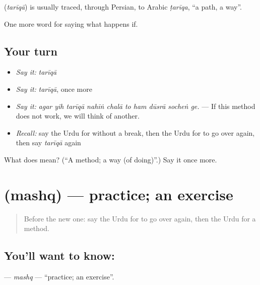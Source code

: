\begin{cousinweb}
\textbf{} (\emph{tarīqā}) is usually traced, through Persian, to Arabic \emph{ṭarīqa}, \textquotedblleft{}a path, a way\textquotedblright{}.
\end{cousinweb}

\begin{grammarlens}[title={What you've built}]
One more word for saying what happens if.
\end{grammarlens}

\subsection*{Your turn}
\begin{itemize}
\raggedright
  \item \emph{Say it:} \emph{tarīqā}
  \item \emph{Say it:} \emph{tarīqā}, once more
  \item \emph{Say it:} \emph{agar yih tarīqā nahīṅ chalā to ham dūsrā socheṅ ge.} — If this method does not work, we will think of another.
  \item \emph{Recall:} say the Urdu for without a break, then the Urdu for to go over again, then say \emph{tarīqā} again
\end{itemize}

\begin{tcolorbox}[breakable,colback=teal!4,colframe=teal!35!black,title={Before you move on}]
What does  mean? (\textquotedblleft{}A method; a way (of doing)\textquotedblright{}.) Say it once more.
\end{tcolorbox}
\section[\texorpdfstring{\ur{مشق} (mashq)}{مشق (mashq)}]{ (mashq) — practice; an exercise}

\label{lesson:UR-C380-mashq}



\begin{quote}
Before the new one: say the Urdu for to go over again, then the Urdu for a method.
\end{quote}

\subsection*{You'll want to know: }
\textbf{} — \emph{mashq} — \textquotedblleft{}practice; an exercise\textquotedblright{}.

